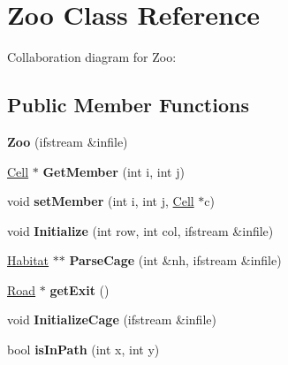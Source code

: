 \hypertarget{classZoo}{}\section{Zoo Class Reference}
\label{classZoo}


Collaboration diagram for Zoo\+:
\subsection*{Public Member Functions}
\begin{DoxyCompactItemize}
\item 
{\bfseries Zoo} (ifstream \&infile)\hypertarget{classZoo_a27c9424fdd277ee7fb10942f5dc7ba63}{}\label{classZoo_a27c9424fdd277ee7fb10942f5dc7ba63}

\item 
\hyperlink{classCell}{Cell} $\ast$ {\bfseries Get\+Member} (int i, int j)\hypertarget{classZoo_a7ac98739901be3877d54365bf70b7fc5}{}\label{classZoo_a7ac98739901be3877d54365bf70b7fc5}

\item 
void {\bfseries set\+Member} (int i, int j, \hyperlink{classCell}{Cell} $\ast$c)\hypertarget{classZoo_a3a0b975693810ddab18a08d78dca8b63}{}\label{classZoo_a3a0b975693810ddab18a08d78dca8b63}

\item 
void {\bfseries Initialize} (int row, int col, ifstream \&infile)\hypertarget{classZoo_a0451247a1e1ada43b4db55bfb27b2916}{}\label{classZoo_a0451247a1e1ada43b4db55bfb27b2916}

\item 
\hyperlink{classHabitat}{Habitat} $\ast$$\ast$ {\bfseries Parse\+Cage} (int \&nh, ifstream \&infile)\hypertarget{classZoo_a2334e111bd9ba1323f75084e72e2b549}{}\label{classZoo_a2334e111bd9ba1323f75084e72e2b549}

\item 
\hyperlink{classRoad}{Road} $\ast$ {\bfseries get\+Exit} ()\hypertarget{classZoo_ad39e2dc6c4f54fb49bcdb92ac116ae15}{}\label{classZoo_ad39e2dc6c4f54fb49bcdb92ac116ae15}

\item 
void {\bfseries Initialize\+Cage} (ifstream \&infile)\hypertarget{classZoo_a51dbb0798d0c94c3f57b77b6b11abb92}{}\label{classZoo_a51dbb0798d0c94c3f57b77b6b11abb92}

\item 
bool {\bfseries is\+In\+Path} (int x, int y)\hypertarget{classZoo_a8176c774c21ec2077495f9bdb2172f4e}{}\label{classZoo_a8176c774c21ec2077495f9bdb2172f4e}


\end{DoxyCompactItemize}
